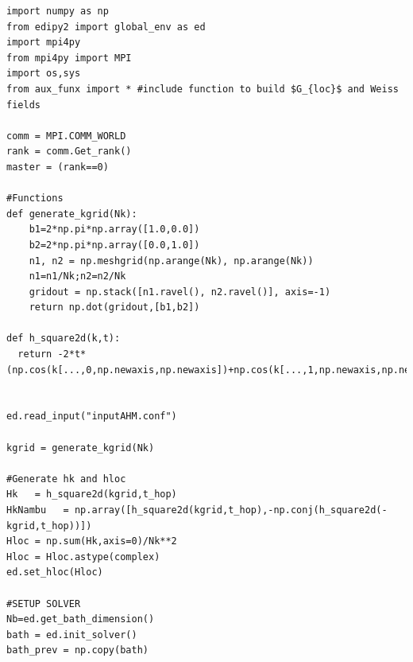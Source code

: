 \documentclass[edipack2.tex]{subfiles}
\begin{document}
\begin{lstlisting}[style=mypython,numbers=none,basicstyle={\scriptsize\ttfamily}]
import numpy as np
from edipy2 import global_env as ed
import mpi4py
from mpi4py import MPI
import os,sys
from aux_funx import * #include function to build $G_{loc}$ and Weiss fields

comm = MPI.COMM_WORLD
rank = comm.Get_rank()
master = (rank==0)

#Functions
def generate_kgrid(Nk):
    b1=2*np.pi*np.array([1.0,0.0])
    b2=2*np.pi*np.array([0.0,1.0])
    n1, n2 = np.meshgrid(np.arange(Nk), np.arange(Nk))
    n1=n1/Nk;n2=n2/Nk
    gridout = np.stack([n1.ravel(), n2.ravel()], axis=-1)
    return np.dot(gridout,[b1,b2])

def h_square2d(k,t):
  return -2*t*(np.cos(k[...,0,np.newaxis,np.newaxis])+np.cos(k[...,1,np.newaxis,np.newaxis]))*np.eye(ed.Norb)
    

ed.read_input("inputAHM.conf")

kgrid = generate_kgrid(Nk)

#Generate hk and hloc
Hk   = h_square2d(kgrid,t_hop)
HkNambu   = np.array([h_square2d(kgrid,t_hop),-np.conj(h_square2d(-kgrid,t_hop))])
Hloc = np.sum(Hk,axis=0)/Nk**2
Hloc = Hloc.astype(complex)
ed.set_hloc(Hloc)

#SETUP SOLVER
Nb=ed.get_bath_dimension()
bath = ed.init_solver()
bath_prev = np.copy(bath)
\end{lstlisting}
\end{document}
